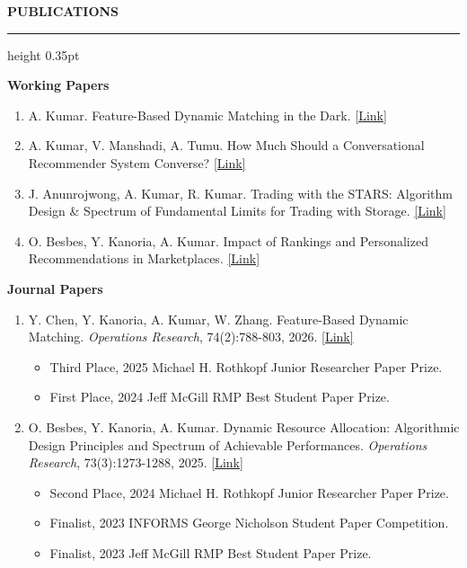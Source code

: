 \documentclass[11pt,letterpaper]{article}
\newcommand{\cvsection}[1]{%
  \Needspace{8\baselineskip}%
  \vspace{1.05em}%
  {\fontsize{14}{16}\selectfont\bfseries\MakeUppercase{#1}}\par
  \vspace{2pt}%
  \hrule height 0.35pt
  \vspace{0.72em}%
}
\newcommand{\cvsubsection}[1]{%
  \Needspace{6\baselineskip}%
  \vspace{0.85em}%
  {\bfseries #1}\par
  \vspace{0.35em}%
}
\newenvironment{cvpubs}{%
  \begin{enumerate}[
    leftmargin=0.75in,
    labelwidth=0.28in,
    labelsep=0.22in,
    align=left,
    itemsep=0.62em,
    topsep=0.15em,
    parsep=0pt
  ]
}{\end{enumerate}}
\newenvironment{cvnotes}{%
  \begin{itemize}[
    label=\textbullet,
    leftmargin=1.85em,
    labelsep=0.45em,
    itemsep=0.1em,
    topsep=0.18em,
    parsep=0pt
  ]
}{\end{itemize}}
\newcommand{\talkvenuefont}{\fontsize{9.1}{10.5}\selectfont}
\newenvironment{cvpubnotes}{%
  \begin{cvnotes}%
  \talkvenuefont
}{%
  \end{cvnotes}%
}
\begin{document}
\cvsection{Publications}
\cvsubsection{Working Papers}
\begin{cvpubs}
  \item A. Kumar. Feature-Based Dynamic Matching in the Dark. \href{https://papers.ssrn.com/sol3/papers.cfm?abstract_id=6839679}{[Link]}

  \item A. Kumar, V. Manshadi, A. Tumu. How Much Should a Conversational Recommender System Converse? \href{https://papers.ssrn.com/sol3/papers.cfm?abstract_id=6481459}{[Link]}

  \item J. Anunrojwong, A. Kumar, R. Kumar. Trading with the STARS: Algorithm Design \& Spectrum of Fundamental Limits for Trading with Storage. \href{https://arxiv.org/abs/2610.07285}{[Link]}

  \item O. Besbes, Y. Kanoria, A. Kumar. Impact of Rankings and Personalized Recommendations in Marketplaces. \href{https://arxiv.org/abs/2506.03369}{[Link]}
\end{cvpubs}

\cvsubsection{Journal Papers}
\begin{cvpubs}
  \item Y. Chen, Y. Kanoria, A. Kumar, W. Zhang. Feature-Based Dynamic Matching. \textit{Operations Research}, 74(2):788-803, 2026. \href{https://pubsonline.informs.org/doi/abs/10.1287/opre.2024.0730}{[Link]}
  \begin{cvpubnotes}
    \item Third Place, 2025 Michael H. Rothkopf Junior Researcher Paper Prize.
    \item First Place, 2024 Jeff McGill RMP Best Student Paper Prize.
  \end{cvpubnotes}

  \item O. Besbes, Y. Kanoria, A. Kumar. Dynamic Resource Allocation: Algorithmic Design Principles and Spectrum of Achievable Performances. \textit{Operations Research}, 73(3):1273-1288, 2025. \href{https://pubsonline.informs.org/doi/10.1287/opre.2022.0504}{[Link]}
  \begin{cvpubnotes}
    \item Second Place, 2024 Michael H. Rothkopf Junior Researcher Paper Prize.
    \item Finalist, 2023 INFORMS George Nicholson Student Paper Competition.
    \item Finalist, 2023 Jeff McGill RMP Best Student Paper Prize.
  \end{cvpubnotes}
\end{cvpubs}
\end{document}
